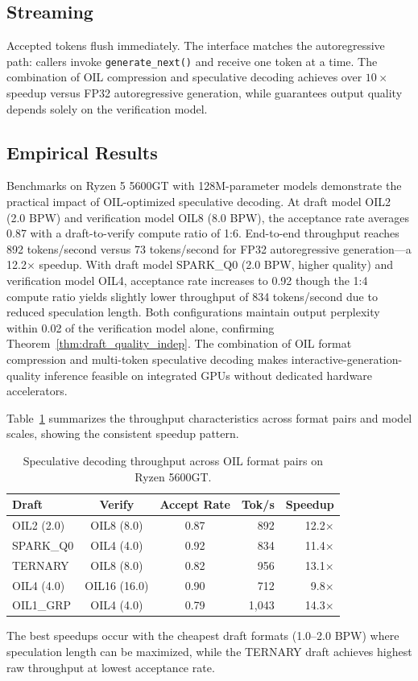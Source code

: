 \subsection{Streaming}

Accepted tokens flush immediately. The interface matches the
autoregressive path: callers invoke \texttt{generate\_next()} and
receive one token at a time. The combination of OIL compression and
speculative decoding achieves over $10\times$ speedup versus FP32
autoregressive generation, while 
guarantees output quality depends solely on the verification model.

\subsection{Empirical Results}

Benchmarks on Ryzen 5 5600GT with 128M-parameter models demonstrate the practical impact of OIL-optimized speculative decoding. At draft model OIL2 (2.0 BPW) and verification model OIL8 (8.0 BPW), the acceptance rate averages 0.87 with a draft-to-verify compute ratio of 1:6. End-to-end throughput reaches 892 tokens/second versus 73 tokens/second for FP32 autoregressive generation---a 12.2$\times$ speedup. With draft model SPARK\_Q0 (2.0 BPW, higher quality) and verification model OIL4, acceptance rate increases to 0.92 though the 1:4 compute ratio yields slightly lower throughput of 834 tokens/second due to reduced speculation length. Both configurations maintain output perplexity within 0.02 of the verification model alone, confirming Theorem~\ref{thm:draft_quality_indep}. The combination of OIL format compression and multi-token speculative decoding makes interactive-generation-quality inference feasible on integrated GPUs without dedicated hardware accelerators.

Table~\ref{tab:spec_performance_summary} summarizes the throughput characteristics across format pairs and model scales, showing the consistent speedup pattern.

\begin{table}[htbp]
\centering
{}
\caption{Speculative decoding throughput across OIL format pairs on Ryzen 5600GT.}
\label{tab:spec_performance_summary}
\begin{tabular}{lccrr}
\toprule
\textbf{Draft} & \textbf{Verify} & \textbf{Accept Rate} & \textbf{Tok/s} & \textbf{Speedup} \\
\midrule
OIL2 (2.0)  & OIL8 (8.0)  & 0.87 & 892 & 12.2$\times$ \\
SPARK\_Q0    & OIL4 (4.0)  & 0.92 & 834 & 11.4$\times$ \\
TERNARY     & OIL8 (8.0)  & 0.82 & 956 & 13.1$\times$ \\
OIL4 (4.0)  & OIL16 (16.0) & 0.90 & 712 & 9.8$\times$  \\
OIL1\_GRP   & OIL4 (4.0)  & 0.79 & 1,043 & 14.3$\times$ \\
\bottomrule
\end{tabular}
\end{table}

The best speedups occur with the cheapest draft formats (1.0--2.0 BPW) where speculation length can be maximized, while the TERNARY draft achieves highest raw throughput at lowest acceptance rate.